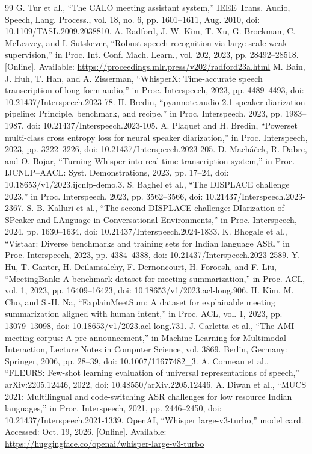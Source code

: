 \documentclass[conference,a4paper]{IEEEtran}
\begin{document}
\begin{thebibliography}{99}
 G. Tur et al., ``The CALO meeting assistant system,'' IEEE Trans. Audio, Speech, Lang. Process., vol. 18, no. 6, pp. 1601--1611, Aug. 2010, doi: 10.1109/TASL.2009.2038810.
 A. Radford, J. W. Kim, T. Xu, G. Brockman, C. McLeavey, and I. Sutskever, ``Robust speech recognition via large-scale weak supervision,'' in Proc. Int. Conf. Mach. Learn., vol. 202, 2023, pp. 28492--28518. [Online]. Available: \url{https://proceedings.mlr.press/v202/radford23a.html}
 M. Bain, J. Huh, T. Han, and A. Zisserman, ``WhisperX: Time-accurate speech transcription of long-form audio,'' in Proc. Interspeech, 2023, pp. 4489--4493, doi: 10.21437/Interspeech.2023-78.
 H. Bredin, ``pyannote.audio 2.1 speaker diarization pipeline: Principle, benchmark, and recipe,'' in Proc. Interspeech, 2023, pp. 1983--1987, doi: 10.21437/Interspeech.2023-105.
 A. Plaquet and H. Bredin, ``Powerset multi-class cross entropy loss for neural speaker diarization,'' in Proc. Interspeech, 2023, pp. 3222--3226, doi: 10.21437/Interspeech.2023-205.
 D. Mach\'{a}\v{c}ek, R. Dabre, and O. Bojar, ``Turning Whisper into real-time transcription system,'' in Proc. IJCNLP--AACL: Syst. Demonstrations, 2023, pp. 17--24, doi: 10.18653/v1/2023.ijcnlp-demo.3.
 S. Baghel et al., ``The DISPLACE challenge 2023,'' in Proc. Interspeech, 2023, pp. 3562--3566, doi: 10.21437/Interspeech.2023-2367.
 S. B. Kalluri et al., ``The second DISPLACE challenge: DIarization of SPeaker and LAnguage in Conversational Environments,'' in Proc. Interspeech, 2024, pp. 1630--1634, doi: 10.21437/Interspeech.2024-1833.
 K. Bhogale et al., ``Vistaar: Diverse benchmarks and training sets for Indian language ASR,'' in Proc. Interspeech, 2023, pp. 4384--4388, doi: 10.21437/Interspeech.2023-2589.
 Y. Hu, T. Ganter, H. Deilamsalehy, F. Dernoncourt, H. Foroosh, and F. Liu, ``MeetingBank: A benchmark dataset for meeting summarization,'' in Proc. ACL, vol. 1, 2023, pp. 16409--16423, doi: 10.18653/v1/2023.acl-long.906.
 H. Kim, M. Cho, and S.-H. Na, ``ExplainMeetSum: A dataset for explainable meeting summarization aligned with human intent,'' in Proc. ACL, vol. 1, 2023, pp. 13079--13098, doi: 10.18653/v1/2023.acl-long.731.
 J. Carletta et al., ``The AMI meeting corpus: A pre-announcement,'' in Machine Learning for Multimodal Interaction, Lecture Notes in Computer Science, vol. 3869. Berlin, Germany: Springer, 2006, pp. 28--39, doi: 10.1007/11677482\_3.
 A. Conneau et al., ``FLEURS: Few-shot learning evaluation of universal representations of speech,'' arXiv:2205.12446, 2022, doi: 10.48550/arXiv.2205.12446.
 A. Diwan et al., ``MUCS 2021: Multilingual and code-switching ASR challenges for low resource Indian languages,'' in Proc. Interspeech, 2021, pp. 2446--2450, doi: 10.21437/Interspeech.2021-1339.
 OpenAI, ``Whisper large-v3-turbo,'' model card. Accessed: Oct. 19, 2026. [Online]. Available: \url{https://huggingface.co/openai/whisper-large-v3-turbo}
\end{thebibliography}
\end{document}
